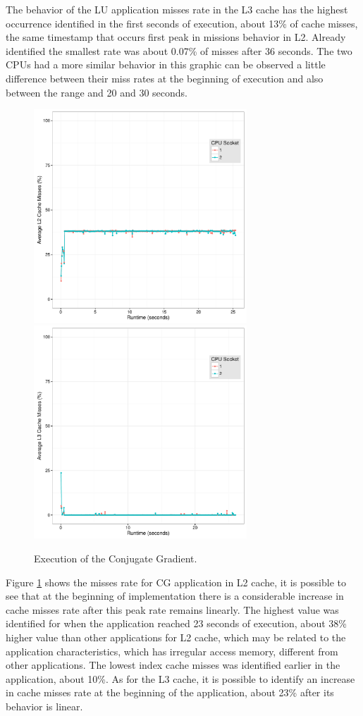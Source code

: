 \documentclass[conference,letter,10pt,final]{IEEEtran}
\begin{document}
The behavior of the LU application misses rate in the L3 cache has the
highest occurrence identified in the first seconds of execution, about
13\% of cache misses, the same timestamp that occurs first peak in
missions behavior in L2. Already identified the smallest rate was
about 0.07\% of misses after 36 seconds. The two CPUs had a more
similar behavior in this graphic can be observed a little difference
between their miss rates at the beginning of execution and also
between the range and 20 and 30 seconds.  

\begin{figure}[htp]\label{figCG}
\centering \includegraphics[width=8cm,height=8cm]{img/cgBNas_Analise.pdf}
\centering \includegraphics[width=8cm,height=8cm]{img/cgBNas_Analise_l3.pdf}
\caption{Execution of the Conjugate Gradient.}
\end{figure}


Figure \ref{figCG} shows the misses rate for CG application in L2 cache, it is
possible to see that at the beginning of implementation there is a
considerable increase in cache misses rate after this peak rate
remains linearly. The highest value was identified for when the
application reached 23 seconds of execution, about 38\% higher value
than other applications for L2 cache, which may be related to the
application characteristics, which has irregular access memory,
different from other applications. The lowest index cache misses was
identified earlier in the application, about 10\%. As for the L3 cache,
it is possible to identify an increase in cache misses rate at the
beginning of the application, about 23\% after its behavior is linear.
\end{document}

